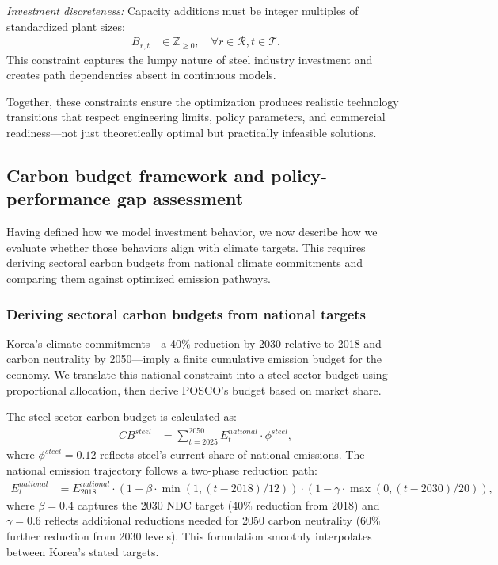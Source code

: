 \textit{Investment discreteness:} Capacity additions must be integer multiples of standardized plant sizes:
\begin{align}
B_{r,t} &\in \mathbb{Z}_{\ge 0}, \quad \forall r \in \mathcal{R}, t \in \mathcal{T}. \label{eq:integer}
\end{align}
This constraint captures the lumpy nature of steel industry investment and creates path dependencies absent in continuous models.

Together, these constraints ensure the optimization produces realistic technology transitions that respect engineering limits, policy parameters, and commercial readiness—not just theoretically optimal but practically infeasible solutions.

\subsection{Carbon budget framework and policy-performance gap assessment}

Having defined how we model investment behavior, we now describe how we evaluate whether those behaviors align with climate targets. This requires deriving sectoral carbon budgets from national climate commitments and comparing them against optimized emission pathways.

\subsubsection{Deriving sectoral carbon budgets from national targets}

Korea's climate commitments—a 40\% reduction by 2030 relative to 2018 and carbon neutrality by 2050—imply a finite cumulative emission budget for the economy. We translate this national constraint into a steel sector budget using proportional allocation, then derive POSCO's budget based on market share.

The steel sector carbon budget is calculated as:
\begin{align}
CB^{steel} &= \sum_{t=2025}^{2050} E^{national}_t \cdot \phi^{steel}, \label{eq:budget_total}
\end{align}
where $\phi^{steel} = 0.12$ reflects steel's current share of national emissions. The national emission trajectory follows a two-phase reduction path:
\begin{align}
E^{national}_t &= E^{national}_{2018} \cdot (1 - \beta \cdot \min(1, (t-2018)/12)) \cdot (1 - \gamma \cdot \max(0, (t-2030)/20)), \label{eq:national_trajectory}
\end{align}
where $\beta = 0.4$ captures the 2030 NDC target (40\% reduction from 2018) and $\gamma = 0.6$ reflects additional reductions needed for 2050 carbon neutrality (60\% further reduction from 2030 levels). This formulation smoothly interpolates between Korea's stated targets.


